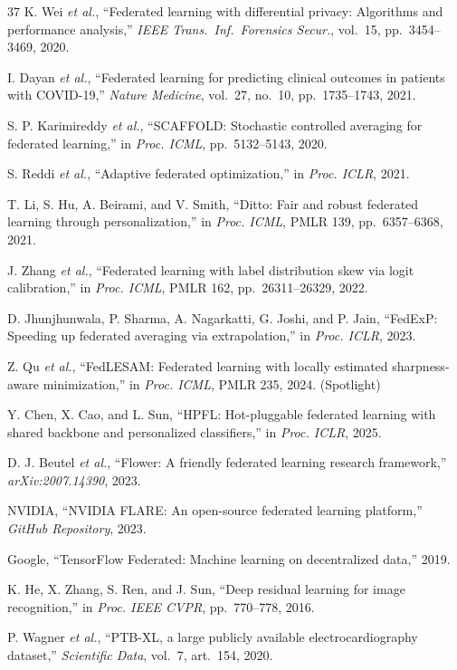 \documentclass[conference]{IEEEtran}
\begin{document}
\begin{thebibliography}{37}
K. Wei \textit{et al.}, ``Federated learning with differential privacy: Algorithms and performance analysis,'' \textit{IEEE Trans.~Inf.~Forensics Secur.}, vol.~15, pp.~3454--3469, 2020.

I. Dayan \textit{et al.}, ``Federated learning for predicting clinical outcomes in patients with COVID-19,'' \textit{Nature Medicine}, vol.~27, no.~10, pp.~1735--1743, 2021.

S. P. Karimireddy \textit{et al.}, ``SCAFFOLD: Stochastic controlled averaging for federated learning,'' in \textit{Proc. ICML}, pp.~5132--5143, 2020.

S. Reddi \textit{et al.}, ``Adaptive federated optimization,'' in \textit{Proc. ICLR}, 2021.

T. Li, S. Hu, A. Beirami, and V. Smith, ``Ditto: Fair and robust federated learning through personalization,'' in \textit{Proc. ICML}, PMLR 139, pp.~6357--6368, 2021.

J. Zhang \textit{et al.}, ``Federated learning with label distribution skew via logit calibration,'' in \textit{Proc. ICML}, PMLR 162, pp.~26311--26329, 2022.

D. Jhunjhunwala, P. Sharma, A. Nagarkatti, G. Joshi, and P. Jain, ``FedExP: Speeding up federated averaging via extrapolation,'' in \textit{Proc. ICLR}, 2023.

Z. Qu \textit{et al.}, ``FedLESAM: Federated learning with locally estimated sharpness-aware minimization,'' in \textit{Proc. ICML}, PMLR 235, 2024. (Spotlight)

Y. Chen, X. Cao, and L. Sun, ``HPFL: Hot-pluggable federated learning with shared backbone and personalized classifiers,'' in \textit{Proc. ICLR}, 2025.

D. J. Beutel \textit{et al.}, ``Flower: A friendly federated learning research framework,'' \textit{arXiv:2007.14390}, 2023.

NVIDIA, ``NVIDIA FLARE: An open-source federated learning platform,'' \textit{GitHub Repository}, 2023.

Google, ``TensorFlow Federated: Machine learning on decentralized data,'' 2019.

K. He, X. Zhang, S. Ren, and J. Sun, ``Deep residual learning for image recognition,'' in \textit{Proc. IEEE CVPR}, pp.~770--778, 2016.

P. Wagner \textit{et al.}, ``PTB-XL, a large publicly available electrocardiography dataset,'' \textit{Scientific Data}, vol.~7, art.~154, 2020.

\end{thebibliography}
\end{document}
